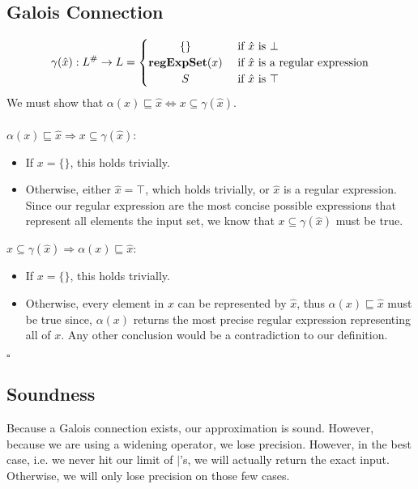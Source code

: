 \documentclass{article}
\newcommand{\regExpSet}[1]{\mathbf{regExpSet}(#1)}
\begin{document}
\subsection{Galois Connection}
\[
 \gamma(\hat{x}): L^\# \rightarrow L =
  \begin{cases} 
      \hfill \{\}    \hfill & \text{ if $\hat{x}$ is $\bot$} \\
      \hfill  \regExpSet{x} \hfill & \text{ if $\hat{x}$ is a regular expression} \\
      \hfill S \hfill & \text{ if $\hat{x}$ is $\top$}
  \end{cases}
\]
We must show that $\alpha(x) \sqsubseteq \hat{x} \iff x \subseteq \gamma(\hat{x})$.
\\\\
$\alpha(x) \sqsubseteq \hat{x} \Rightarrow x \subseteq \gamma(\hat{x})$:
\begin{itemize}
	\item If  $x = \{\}$, this holds trivially.
	\item Otherwise, either $\hat{x} = \top$, which holds trivially, or $\hat{x}$ is a regular expression. Since our regular expression are the most concise possible expressions that represent all elements the input set, we know that $x \subseteq \gamma(\hat{x})$ must be true. 
\end{itemize}
$ x \subseteq \gamma(\hat{x}) \Rightarrow \alpha(x) \sqsubseteq \hat{x}$:
\begin{itemize}
	\item If  $x = \{\}$, this holds trivially.
	\item Otherwise, every element in $x$ can be represented by $\hat{x}$, thus $\alpha(x) \sqsubseteq \hat{x}$ must be true since, $\alpha(x)$ returns the most precise regular expression representing all of $x$.  Any other conclusion would be a contradiction to our definition.
	\end{itemize}
$\square$

\subsection{Soundness}
Because a Galois connection exists, our approximation is sound.  However, because we are using a widening operator, we lose precision.  However, in the best case, i.e. we never hit our limit of $|$'s, we will actually return the exact input.  Otherwise, we will only lose precision on those few cases.
\end{document}
